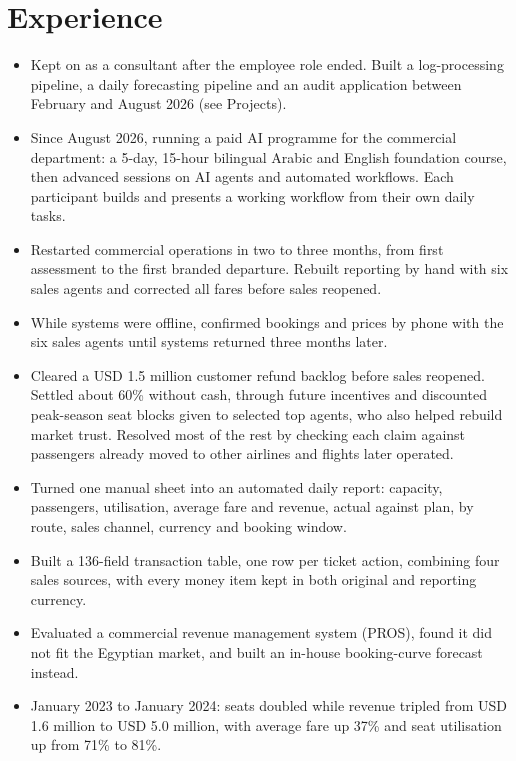 \section{Experience}
\begin{itemize}
  \item Kept on as a consultant after the employee role ended. Built a log-processing pipeline, a daily forecasting pipeline and an audit application between February and August 2026 (see Projects).
  \item Since August 2026, running a paid AI programme for the commercial department: a 5-day, 15-hour bilingual Arabic and English foundation course, then advanced sessions on AI agents and automated workflows. Each participant builds and presents a working workflow from their own daily tasks.
\end{itemize}

\begin{itemize}
  \item Restarted commercial operations in two to three months, from first assessment to the first branded departure. Rebuilt reporting by hand with six sales agents and corrected all fares before sales reopened.
  \item While systems were offline, confirmed bookings and prices by phone with the six sales agents until systems returned three months later.
  \item Cleared a USD 1.5 million customer refund backlog before sales reopened. Settled about 60\% without cash, through future incentives and discounted peak-season seat blocks given to selected top agents, who also helped rebuild market trust. Resolved most of the rest by checking each claim against passengers already moved to other airlines and flights later operated.
  \item Turned one manual sheet into an automated daily report: capacity, passengers, utilisation, average fare and revenue, actual against plan, by route, sales channel, currency and booking window.
  \item Built a 136-field transaction table, one row per ticket action, combining four sales sources, with every money item kept in both original and reporting currency.
  \item Evaluated a commercial revenue management system (PROS), found it did not fit the Egyptian market, and built an in-house booking-curve forecast instead.
  \item January 2023 to January 2024: seats doubled while revenue tripled from USD 1.6 million to USD 5.0 million, with average fare up 37\% and seat utilisation up from 71\% to 81\%.
\end{itemize}

